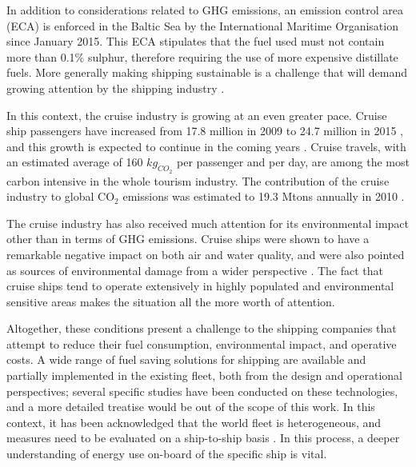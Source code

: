 \documentclass[preprint,12pt]{elsarticle}
\begin{document}

In addition to considerations related to GHG emissions, an emission control area (ECA) is enforced in the Baltic Sea  by the International Maritime Organisation since January 2015. This ECA stipulates that the fuel used must not contain more than 0.1\% sulphur, therefore requiring the use of more expensive distillate fuels. More generally making shipping sustainable is a challenge that will demand growing attention by the shipping industry \cite{Andersson2016}.


In this context, the cruise industry is growing at an even greater pace. Cruise ship passengers have increased from 17.8 million in 2009 to 24.7 million in 2015 \cite{CruiseOutlook2017}, and this growth is expected to continue in the coming years \cite{CruiseOutlook2017}. Cruise travels, with an estimated average of 160 $kg_{CO_2}$ per passenger and per day, are among the most carbon intensive in the whole tourism industry. The contribution of the cruise industry to global CO$_2$ emissions was estimated to 19.3 Mtons annually in 2010 \cite{Eijgelaar2010}.

The cruise industry has also received much attention for its environmental impact other than in terms of GHG emissions. Cruise ships were shown to have a remarkable negative impact on both air \cite{Poplawski2011} and water \cite{Butt2007} quality, and were also pointed as sources of environmental damage from a wider perspective \cite{Brida2009}. The fact that cruise ships tend to operate extensively in highly populated and environmental sensitive areas makes the situation all the more worth of attention.

Altogether, these conditions present a challenge to the shipping companies that attempt to reduce their fuel consumption, environmental impact, and operative costs. A wide range of fuel saving solutions for shipping are available and partially implemented in the existing fleet, both from the design and operational perspectives; several specific studies have been conducted on these technologies, and a more detailed treatise would be out of the scope of this work. In this context, it has been acknowledged that the world fleet is heterogeneous, and measures need to be evaluated on a ship-to-ship basis \cite{Bouman2017}. In this process, a deeper understanding of energy use on-board of the specific ship is vital.
\end{document}

